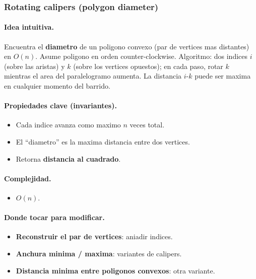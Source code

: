 ﻿\subsubsection{Rotating calipers (polygon diameter)}

\paragraph{Idea intuitiva.}
Encuentra el \textbf{diametro} de un poligono convexo (par de vertices mas distantes) en $O(n)$. Asume poligono en orden counter-clockwise. Algoritmo: dos indices $i$ (sobre las aristas) y $k$ (sobre los vertices opuestos); en cada paso, rotar $k$ mientras el area del paralelogramo aumenta. La distancia $i$-$k$ puede ser maxima en cualquier momento del barrido.

\paragraph{Propiedades clave (invariantes).}
\begin{itemize}\setlength\itemsep{0pt}
	\item Cada indice avanza como maximo $n$ veces total.
	\item El ``diametro'' es la maxima distancia entre dos vertices.
	\item Retorna \textbf{distancia al cuadrado}.
\end{itemize}

\paragraph{Complejidad.}
\begin{itemize}\setlength\itemsep{0pt}
	\item $O(n)$.
\end{itemize}

\paragraph{Donde tocar para modificar.}
\begin{itemize}\setlength\itemsep{0pt}
	\item \textbf{Reconstruir el par de vertices}: aniadir indices.
	\item \textbf{Anchura minima / maxima}: variantes de calipers.
	\item \textbf{Distancia minima entre poligonos convexos}: otra variante.
\end{itemize}

